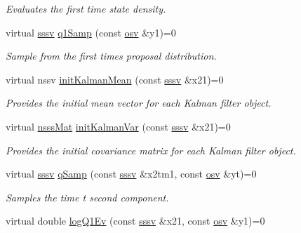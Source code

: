 \begin{DoxyCompactItemize}
\begin{DoxyCompactList}\small\item\em Evaluates the first time state density. \end{DoxyCompactList}\item 
virtual \hyperlink{classrbpf__kalman_a17f2cf0b4ee4a1c8f2bfdb5356c53844}{sssv} \hyperlink{classrbpf__kalman_a1ac1dd4d74cf42c12236540e2e48b981}{q1\+Samp} (const \hyperlink{classrbpf__kalman_a4fdeb1b9b626811569b6ac4327c6cbb2}{osv} \&y1)=0
\begin{DoxyCompactList}\small\item\em Sample from the first time\textquotesingle{}s proposal distribution. \end{DoxyCompactList}\item 
virtual nssv \hyperlink{classrbpf__kalman_a3f8823c150e555deedd70247d9af761d}{init\+Kalman\+Mean} (const \hyperlink{classrbpf__kalman_a17f2cf0b4ee4a1c8f2bfdb5356c53844}{sssv} \&x21)=0
\begin{DoxyCompactList}\small\item\em Provides the initial mean vector for each Kalman filter object. \end{DoxyCompactList}\item 
virtual \hyperlink{classrbpf__kalman_afa2599778bdaa2419739a838565df672}{nsss\+Mat} \hyperlink{classrbpf__kalman_a867db2c771fb19f78be851f0d6cf8d5c}{init\+Kalman\+Var} (const \hyperlink{classrbpf__kalman_a17f2cf0b4ee4a1c8f2bfdb5356c53844}{sssv} \&x21)=0
\begin{DoxyCompactList}\small\item\em Provides the initial covariance matrix for each Kalman filter object. \end{DoxyCompactList}\item 
virtual \hyperlink{classrbpf__kalman_a17f2cf0b4ee4a1c8f2bfdb5356c53844}{sssv} \hyperlink{classrbpf__kalman_a5381a792b50806ab83ba701f7fb2849a}{q\+Samp} (const \hyperlink{classrbpf__kalman_a17f2cf0b4ee4a1c8f2bfdb5356c53844}{sssv} \&x2tm1, const \hyperlink{classrbpf__kalman_a4fdeb1b9b626811569b6ac4327c6cbb2}{osv} \&yt)=0
\begin{DoxyCompactList}\small\item\em Samples the time t second component. \end{DoxyCompactList}\item 
virtual double \hyperlink{classrbpf__kalman_a857cdb7261de19194ed17dddb3136821}{log\+Q1\+Ev} (const \hyperlink{classrbpf__kalman_a17f2cf0b4ee4a1c8f2bfdb5356c53844}{sssv} \&x21, const \hyperlink{classrbpf__kalman_a4fdeb1b9b626811569b6ac4327c6cbb2}{osv} \&y1)=0

\end{DoxyCompactItemize}
